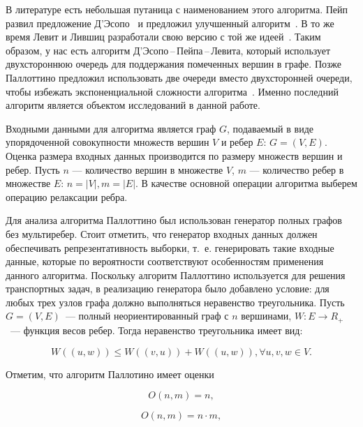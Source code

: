 \documentclass[a4paper,fontsize=14pt]{article}
\begin{document}
В литературе есть небольшая путаница с наименованием этого алгоритма. Пейп развил предложение Д'Эсопо~\cite{desopo} и предложил улучшенный алгоритм~\cite{pape}. В то же время Левит и Лившиц разработали свою версию с той же идеей~\cite{levit_livshits}. Таким образом, у нас есть алгоритм Д'Эсопо\,--\,Пейпа\,--\,Левита, который использует двухстороннюю очередь для поддержания помеченных вершин в графе. Позже Паллоттино предложил использовать две очереди вместо двухсторонней очереди, чтобы избежать экспоненциальной сложности алгоритма~\cite{pallottino}. Именно последний алгоритм является объектом исследований в данной работе.

Входными данными для алгоритма является граф $G$, подаваемый в виде упорядоченной совокупности множеств вершин $V$ и ребер $E$: $G = (V, E)$. Оценка размера входных данных производится по размеру множеств вершин и ребер. Пусть $n$ — количество вершин в множестве $V$, $m$ — количество ребер в множестве $E$: $n = |V|, m = |E|$. В качестве основной операции алгоритма выберем операцию релаксации ребра.

Для анализа алгоритма Паллоттино был использован генератор полных графов без мультиребер. Стоит отметить, что генератор входных данных должен обеспечивать репрезентативность выборки, т.~е. генерировать такие входные данные, которые по вероятности соответствуют особенностям применения данного алгоритма. Поскольку алгоритм Паллоттино используется для решения транспортных задач, в реализацию генератора было добавлено условие: для любых трех узлов графа должно выполняться неравенство треугольника. Пусть $G = (V, E)$~--- полный неориентированный граф с $n$ вершинами, $W: E \rightarrow R_+$~--- функция весов ребер. Тогда неравенство треугольника имеет вид:

\begin{equation}\label{eq:triangle_inequality}
W((u, w)) \leq W((v, u)) + W((u, w)), \forall u, v, w \in V.
\end{equation}

Отметим, что алгоритм Паллотино имеет оценки

\begin{equation}\label{eq:pallottino_best}
O(n, m) = n,
\end{equation}

\begin{equation}\label{eq:pallottino_average}
O(n, m) = n \cdot m,
\end{equation}
\end{document}
